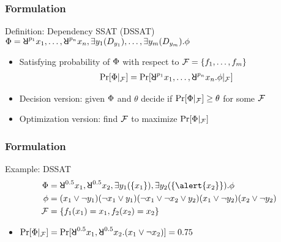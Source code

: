 \begin{frame}
  \frametitle{Formulation}
  \begin{block}{Definition: Dependency SSAT (DSSAT)}
    $\Qf=\random{p_1} x_1, \ldots, \random{p_n} x_n, \exists y_1(D_{y_1}), \ldots, \exists y_m(D_{y_m}).\pf$
    \begin{itemize}
      \item Satisfying probability of $\Phi$ with respect to $\mathcal{F}=\{f_1,\ldots,f_m\}$
            \begin{align*}
              \spb{\pcf{\Qf}{\skf}}=\Pr[\random{p_1} x_1, \ldots, \random{p_n} x_n.\pf|_{\skf}]
            \end{align*}
    \end{itemize}
    \begin{itemize}
      \item Decision version: given $\Phi$ and $\theta$ decide if $\Pr[\Phi|_{\mathcal{F}}] \geq \theta$ for some $\mathcal{F}$
      \item Optimization version: find $\mathcal{F}$ to maximize $\Pr[\Phi|_{\mathcal{F}}]$
    \end{itemize}
  \end{block}
\end{frame}

\begin{frame}
  \frametitle{Formulation}
  \begin{block}{Example: DSSAT}
    \abovedisplayskip=0pt
    \belowdisplayskip=0pt
    \begin{align*}
      \Qf  & = \random{0.5} x_1,\random{0.5} x_2,\exists y_1(\{x_1\}),\exists y_2(\{\alert{x_2}\}).\pf \\
      \pf  & = (x_1 \lor \lnot y_1)
      (\lnot x_1 \lor y_1)
      (\lnot x_1 \lor \lnot x_2 \lor y_2)
      (x_1 \lor \lnot y_2)
      (x_2 \lor \lnot y_2)                                                                             \\
      \skf & =\{f_1(x_1)=x_1,f_2(x_2)=x_2\}
    \end{align*}
    \begin{itemize}
      \item $\spb{\pcf{\Qf}{\skf}}=\spb{\random{0.5} x_1,\random{0.5} x_2.(x_1\lor\lnot x_2)}=0.75$
    \end{itemize}
  \end{block}
\end{frame}